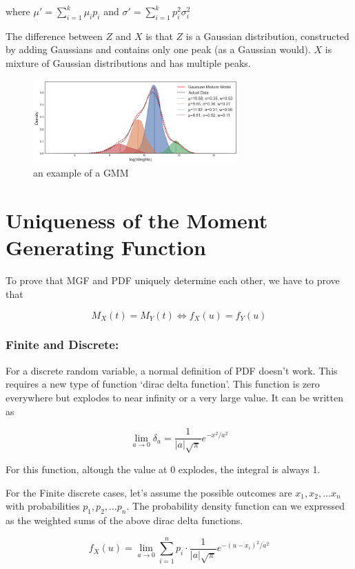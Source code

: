 \documentclass[openany]{book}
\begin{document}
        where $\mu' = \sum_{i=1}^{k} \mu_i p_i$ and $\sigma' = \sum_{i=1}^{k} p_i^2 \sigma_i ^2$
        
        
        The difference between $Z$ and $X$ is that $Z$ is a Gaussian distribution, constructed by adding Gaussians and 
        contains only one peak (as a Gaussian would). $X$ is mixture of Gaussian distributions and has multiple peaks.
        
        \begin{figure}[H]
            \centering
            \includegraphics*[width=0.7\textwidth]{photos/gmm.png}
            \caption*{an example of a GMM}
        \end{figure}
    

\chapter{Uniqueness of the Moment Generating Function}
	To prove that MGF and PDF uniquely determine each other, we have to prove that 
	
	\[ M_X(t) = M_Y(t) \iff f_X(u) = f_Y(u) \]
	
	\subsection*{Finite and Discrete:}
	For a discrete random variable, a normal definition of PDF doesn't work. This requires a new type of function
	`dirac delta function'. This function is zero everywhere but explodes to near infinity or a very large value. 
	It can be written as 
	
	\[ \lim_{a \rightarrow 0} \delta_a = \frac{1}{|a|\sqrt{\pi}}e^{-x^2/a^2} \]
	
	For this function, altough the value at $0$ explodes, the integral is always 1.
	
	For the Finite discrete cases, let's assume the possible outcomes are $x_1, x_2, \dots x_n$ with probabilities
	$p_1, p_2, \dots p_n$. The probability density function can we expressed as the weighted sums of the above dirac 
	delta functions.
	
	\[ f_X(u) = \lim_{a \rightarrow 0} \sum_{i=1}^{n} p_i \cdot \frac{1}{|a|\sqrt{\pi}}e^{-(u-x_i)^2/a^2}  \]
	
\end{document}

